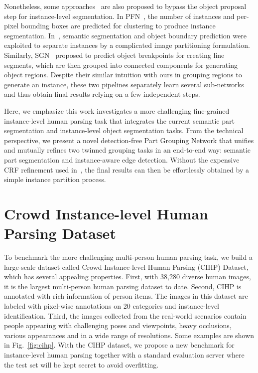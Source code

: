 \documentclass[runningheads]{llncs}
\begin{document}
Nonetheless, some approaches~\cite{liang2015proposal,Kirillov_2017_CVPR,Liu_2017_ICCV,Ren_2017_CVPR,Bai_2017_CVPR,romera2016recurrent} are also proposed to bypass the object proposal step for instance-level segmentation. In PFN~\cite{liang2015proposal}, the number of instances and per-pixel bounding boxes are predicted for clustering to produce instance segmentation. In~\cite{Kirillov_2017_CVPR}, semantic segmentation and object boundary prediction were exploited to separate instances by a complicated image partitioning formulation. Similarly, SGN~\cite{Liu_2017_ICCV} proposed to predict object breakpoints for creating line segments, which are then grouped into connected components for generating object regions. Despite their similar intuition with ours in grouping regions to generate an instance, these two pipelines separately learn several sub-networks and thus obtain final results relying on a few independent steps.

Here, we emphasize this work investigates a more challenging fine-grained instance-level human parsing task that integrates the current semantic part segmentation and instance-level object segmentation tasks. From the technical perspective, we present a novel detection-free Part Grouping Network that unifies and mutually refines two twinned grouping tasks in an end-to-end way: semantic part segmentation and instance-aware edge detection. Without the expensive CRF refinement used in~\cite{li2017holistic}, the final results can then be effortlessly obtained by a simple instance partition process.





\section{Crowd Instance-level Human Parsing Dataset}
To benchmark the more challenging multi-person human parsing task, we build a large-scale dataset called Crowd Instance-level Human Parsing (CIHP) Dataset, which has several appealing properties. First, with 38,280 diverse human images, it is the largest multi-person human parsing dataset to date. Second, CIHP is annotated with rich information of person items. The images in this dataset are labeled with pixel-wise annotations on 20 categories and instance-level identification. Third, the images collected from the real-world scenarios contain people appearing with challenging poses and viewpoints, heavy occlusions, various appearances and in a wide range of resolutions. Some examples are shown in Fig.~\ref{fig:cihp}. With the CIHP dataset, we propose a new benchmark for instance-level human parsing together with a standard evaluation server where the test set will be kept secret to avoid overfitting.
\end{document}
